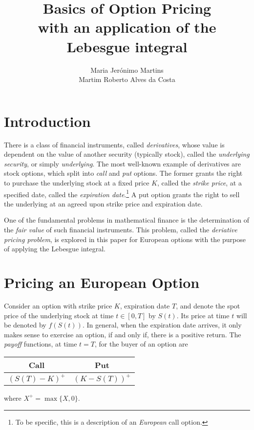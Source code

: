 \documentclass[]{article}
\title{%
	Basics of Option Pricing\\
	\large with an application of the Lebesgue integral}
\author{Maria Jerónimo Martins \\ Martim Roberto Alves da Costa}
\theoremstyle{definition}
\theoremstyle{remark}
\begin{document}
\maketitle

\section{Introduction}
There is a class of financial instruments, called \textit{derivatives}, whose value is dependent on the value of another security (typically stock), called the \textit{underlying security}, or simply \textit{underlying}. The most well-known example of derivatives are stock options, which split into \textit{call} and \textit{put} options. The former grants the right to purchase the underlying stock at a fixed price $K$, called the \textit{strike price}, at a specified date, called the \textit{expiration date}.\footnote{To be specific, this is a description of an \textit{European} call option.}
	A put option grants the right to sell the underlying at an agreed upon strike price and expiration date. 
	\par One of the fundamental problems in mathematical finance is the determination of the \textit{fair value} of such financial instruments. This problem, called the \textit{deriative pricing problem}, is explored in this paper for European options with the purpose of applying the Lebesgue integral.

\section{Pricing an European Option}
Consider an option with strike price $K$, expiration date $T$, and denote the spot price of the underlying stock at time $t \in [0, T]$ by $S(t)$. Its price at time $t$ will be denoted by $f(S(t))$. In general, when the expiration date arrives, it only makes sense to exercise an option, if and only if, there is a positive return. The \textit{payoff} functions, at time $t=T$, for the buyer of an option are
\begin{center}
	\begin{tabular}{|c|c|}
		\hline
		Call      & Put       \\ \hline
		$(S(T)-K)^+$ & $(K-S(T))^+$ \\ \hline
	\end{tabular}
\end{center}

where $X^+ = \max \{X,0\}$.
\par 
\end{document}
